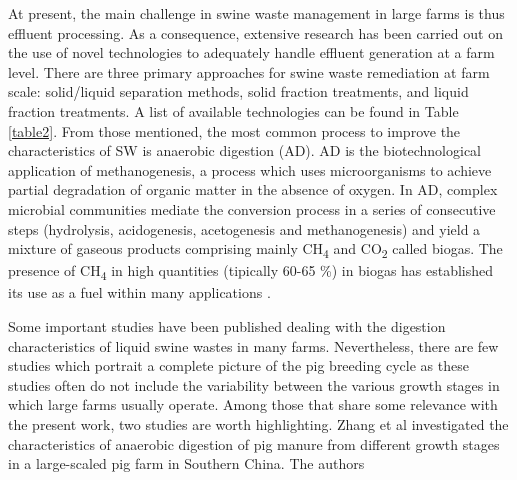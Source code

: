 At present, the main challenge in swine waste management in large farms is thus effluent processing. As a consequence, extensive research has been carried out on the use of novel technologies to adequately handle effluent generation at a farm level. There are three primary approaches for swine waste remediation at farm scale: solid/liquid separation methods, solid fraction treatments, and liquid fraction treatments. A list of available technologies can be found in Table \ref{table2}. From those mentioned, the most common process to improve the characteristics of SW is anaerobic digestion (AD). AD is the biotechnological application of methanogenesis, a process which uses microorganisms to achieve partial degradation of organic matter in the absence of oxygen. In AD, complex microbial communities mediate the conversion process in a series of consecutive steps (hydrolysis, acidogenesis, acetogenesis and methanogenesis) and yield a mixture of gaseous products comprising mainly CH\textsubscript{4} and CO\textsubscript{2} called biogas. The presence of CH\textsubscript{4} in high quantities (tipically 60-65 \%) in biogas has established its use as a fuel within many applications \cite{Mata_Alvarez_2014,O_Flaherty_2010}.

Some important studies have been published dealing with the digestion characteristics of liquid swine wastes in many farms. Nevertheless, there are few studies which portrait a complete picture of the pig breeding cycle as these studies often do not include the variability between the various growth stages in which large farms usually operate. Among those that share some relevance with the present work, two studies are worth highlighting. Zhang et al \cite{Zhang_2014} investigated the characteristics of anaerobic digestion of pig manure from different growth stages in a large-scaled pig farm in Southern China. The authors 